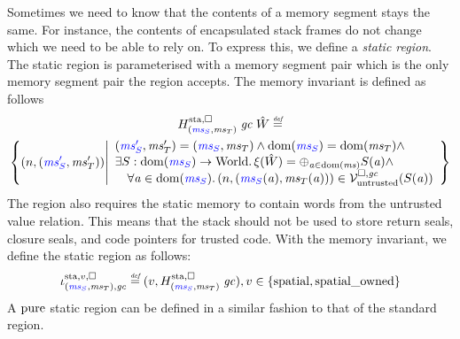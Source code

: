 \begin{jversion}
Sometimes we need to know that the contents of a memory segment stays the same.
For instance, the contents of encapsulated stack frames do not change which we need to be able to rely on.
To express this, we define a \emph{static region}.
The static region is parameterised with a memory segment pair which is the only memory segment pair the region accepts.
The memory invariant is defined as follows
\begin{multline*}
  H^\mathrm{sta,\square}_{\stpair{\ms}{\ms}} \; \gc \; \hat{W} \defeq\\
  \left\{
      \npair{\stpair{\ms'}{\ms'}} \middle|
      \begin{array}{l}
        \stpair{\ms'}{\ms'} = \stpair{\ms}{\ms} \wedge \dom(\src{\ms_S}) = \dom(\ms_T) \wedge \\
        \exists S : \dom(\src{\ms_S}) \fun \World \ldotp \xi(\hat{W}) = \oplus_{\aaddr \in \dom(\ms)} S(\aaddr) \wedge\\
        \quad \forall \aaddr \in \dom(\src{\ms_S}) \ldotp \npair{(\src{\ms_S}(\aaddr),\ms_T(\aaddr))} \in \lrv(S(\aaddr))
      \end{array}
    \right\}
\end{multline*}
The region also requires the static memory to contain words from the untrusted value relation.
This means that the stack should not be used to store return seals, closure seals, and code pointers for trusted code.
With the memory invariant, we define the static region as follows:
\[
  \stareg[\stpair{\ms}{\ms},\gc]{v,\square} \defeq (v,H^\mathrm{sta,\square}_{\stpair{\ms}{\ms}} \; \gc) , v \in \{\spatial,\spatialo\}
\]
A $\mathrm{pure}$ static region can be defined in a similar fashion to that of the standard region.


\end{jversion}

